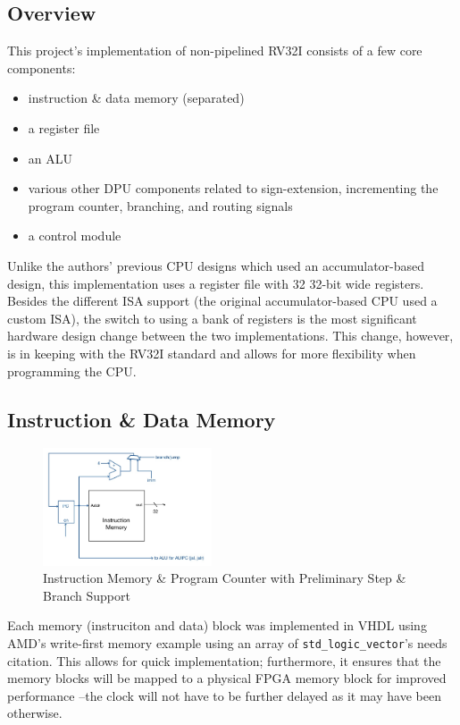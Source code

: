 \documentclass[lettersize,journal]{IEEEtran}
\begin{document}
\subsection{Overview}
This project's implementation of non-pipelined RV32I consists of a few core components:
\begin{itemize}
    \item instruction \& data memory (separated)
    \item a register file
    \item an ALU
    \item various other DPU components related to sign-extension, incrementing the program counter, branching, and routing signals
    \item a control module
\end{itemize}
Unlike the authors' previous CPU designs which used an accumulator-based design, this implementation uses a register file with 32 32-bit wide registers.
Besides the different ISA support (the original accumulator-based CPU used a custom ISA),
the switch to using a bank of registers is the most significant hardware design change between the two implementations.
This change, however, is in keeping with the RV32I standard and allows for more flexibility when programming the CPU.

\subsection{Instruction \& Data Memory}
\begin{figure}[!h]
    \label{fig:instmemblock}
    \centering
    \includegraphics[width=5cm]{CPTR380_inst_mem.png}
    \caption{Instruction Memory \& Program Counter with Preliminary Step \& Branch Support}
\end{figure}
Each memory (instruciton and data) block was implemented in VHDL using AMD's write-first memory example using an array of \verb|std_logic_vector|'s \color{red}needs citation\color{black}.
This allows for quick implementation; furthermore, it ensures that the memory blocks will be mapped to a physical FPGA memory block for improved performance
--the clock will not have to be further delayed as it may have been otherwise.
\end{document}
